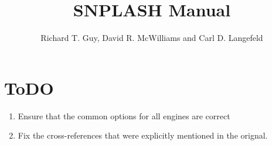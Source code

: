 \documentclass{article}
\author{Richard T. Guy, David R. McWilliams and Carl D. Langefeld}
\title{SNPLASH Manual}
\begin{document}
\maketitle










\section{ToDO}
\begin{enumerate}

\item Ensure that the common options for all engines are correct
\item Fix the cross-references that were explicitly mentioned in the orignal.

\end{enumerate}




\end{document}
